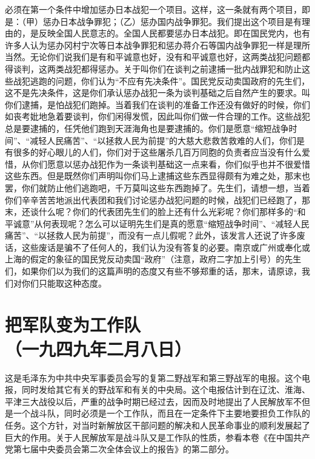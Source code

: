 \documentclass[cn,11pt,chinese]{elegantbook}
\def\myformat#1{\hfil\hfil #1}
\begin{document}
必须在第一个条件中增加惩办日本战犯一个项目。这样，这一条就有两个项目，即是：（甲）惩办日本战争罪犯；（乙）惩办国内战争罪犯。我们提出这个项目是有理由的，是反映全国人民意志的。全国人民都要惩办日本战犯。即在国民党内，也有许多人认为惩办冈村宁次等日本战争罪犯和惩办蒋介石等国内战争罪犯一样是理所当然。无论你们说我们是有和平诚意也好，没有和平诚意也好，这两类战犯问题都得谈判，这两类战犯都得惩办。关于叫你们在谈判之前逮捕一批内战罪犯和防止这些战犯逃跑的问题，你们认为“不应有先决条件”。国民党反动卖国政府的先生们，这不是先决条件，这是你们承认惩办战犯一条为谈判基础之后自然产生的要求。叫你们逮捕，是怕战犯们跑掉。当着我们在谈判的准备工作还没有做好的时候，你们如丧考妣地急着要谈判，你们闲得发慌，因此叫你们做一件合理的工作。这些战犯总是要逮捕的，任凭他们跑到天涯海角也是要逮捕的。你们是愿意“缩短战争时间”、“减轻人民痛苦”、“以拯救人民为前提”的大慈大悲救苦救难的人们，你们是有很多的好心眼儿的人们，你们对于这些屠杀几百万同胞的负责者应当没有什么爱惜，从你们愿意以惩办战犯作为一条谈判基础这一点来看，你们似乎也并不很爱惜这些东西。但是既然你们声明叫你们马上逮捕这些东西显得颇有为难之处，那末也罢，你们就防止他们逃跑吧，千万莫叫这些东西跑掉了。先生们，请想一想，当着你们辛辛苦苦地派出代表团和我们讨论惩办战犯问题的时候，战犯们已经跑了，那末，还谈什么呢？你们的代表团先生们的脸上还有什么光彩呢？你们那样多的“和平诚意”从何表现呢？怎么可以证明先生们是真的愿意“缩短战争时间”、“减轻人民痛苦”、“以拯救人民为前提”，而没有一点儿假呢？此外，该发言人还说了许多废话，这些废话是骗不了任何人的，我们认为没有答复的必要。南京或广州或奉化或上海的假定的象征的国民党反动卖国“政府”（注意，政府二字加上引号）的先生们，如果你们以为我们的这篇声明的态度又有些不够郑重的话，那末，请原谅，我们对你们只能取这种态度。\\
\newpage\section*{\myformat{把军队变为工作队}\\\myformat{（一九四九年二月八日）}}
\begin{introduction}
\item 这是毛泽东为中共中央军事委员会写的复第二野战军和第三野战军的电报。这个电报，同时发给其它有关的野战军和有关的中央局。这个电报估计到在辽沈、淮海、平津三大战役以后，严重的战争时期已经过去，因而及时地提出了人民解放军不但是一个战斗队，同时必须是一个工作队，而且在一定条件下主要地要担负工作队的任务。这个方针，对当时新解放区干部问题的解决和人民革命事业的顺利发展起了巨大的作用。关于人民解放军是战斗队又是工作队的性质，参看本卷《在中国共产党第七届中央委员会第二次全体会议上的报告》的第二部分。
\end{introduction}
\end{document}
